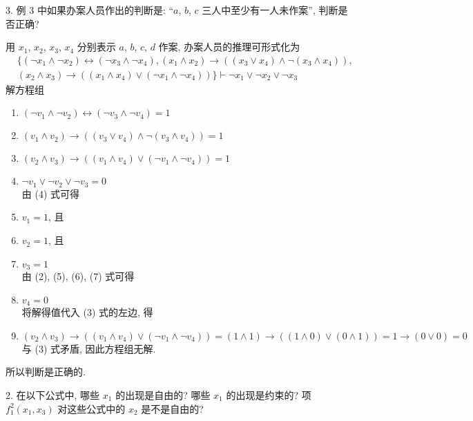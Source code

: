 \documentclass[boxes]{homework}
\begin{document}
\begin{problem}
3. 例 3 中如果办案人员作出的判断是: ``$a$, $b$, $c$ 三人中至少有一人未作案'', 判断是否正确?
\end{problem}
\begin{solution}
    用 $x_1$, $x_2$, $x_3$, $x_4$ 分别表示 $a$, $b$, $c$, $d$ 作案, 办案人员的推理可形式化为
    \begin{align*}
         & \{(\lnot x_1\land\lnot x_2)\leftrightarrow(\lnot x_3\land \lnot x_4), (x_1\land x_2)\to ((x_3\lor x_4)\land \lnot(x_3\land x_4)), \\
         & (x_2\land x_3)\to ((x_1\land x_4)\lor (\lnot x_1\land \lnot x_4))\}\vdash \lnot x_1\lor\lnot x_2\lor \lnot x_3
    \end{align*}
    解方程组
    \begin{enumerate}[label = (\arabic*), itemsep = 0em, topsep = .5em, partopsep = .5em]
        \item $(\lnot v_1\land\lnot v_2)\leftrightarrow(\lnot v_3\land \lnot v_4)=1$
        \item $(v_1\land v_2)\to ((v_3\lor v_4)\land \lnot(v_3\land v_4))=1$
        \item $(v_2\land v_3)\to ((v_1\land v_4)\lor (\lnot v_1\land \lnot v_4))=1$
        \item $\lnot v_1\lor\lnot v_2\lor \lnot v_3=0$\\
              由 (4) 式可得
        \item $v_1=1$, 且
        \item $v_2=1$, 且
        \item $v_3=1$\\
              由 (2), (5), (6), (7) 式可得
        \item $v_4 = 0$\\
              将解得值代入 (3) 式的左边, 得
        \item $(v_2\land v_3)\to ((v_1\land v_4)\lor (\lnot v_1\land \lnot v_4))=(1\land 1)\to ((1\land 0)\lor (0\land 1)) = 1\to (0\lor 0) = 0$\\
              与 (3) 式矛盾, 因此方程组无解.
    \end{enumerate}
    所以判断是正确的.
\end{solution}
\begin{problem}
2. 在以下公式中, 哪些 $x_1$ 的出现是自由的? 哪些 $x_1$ 的出现是约束的? 项 $f_1^2(x_1, x_3)$ 对这些公式中的 $x_2$ 是不是自由的?
\end{problem}
\end{document}

